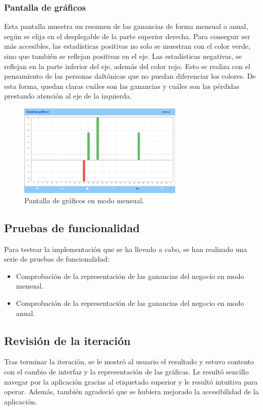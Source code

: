 \newpage

\subsubsection{Pantalla de gráficos}

Esta pantalla muestra un resumen de las ganancias de forma mensual o anual, según se elija en el desplegable de la parte superior derecha. Para conseguir ser más accesibles, las estadísticas positivas no solo se muestran con el color verde, sino que también se reflejan positivas en el eje. Las estadísticas negativas, se reflejan en la parte inferior del eje, además del color rojo. Esto se realiza con el pensamiento de las personas daltónicas que no puedan diferenciar los colores. De esta forma, quedan claras cuáles son las ganancias y cuáles son las pérdidas prestando atención al eje de la izquierda. 

\begin{figure}[H]
	\centering
	\includegraphics[width=0.7\textwidth]{imagenes/TerceraIteracion/graficosMensual.png}
	\caption{Pantalla de gráficos en modo mensual.}
\end{figure}

\subsection{Pruebas de funcionalidad}

Para testear la implementación que se ha llevado a cabo, se han realizado una serie de pruebas de funcionalidad: 

\begin{itemize}
	\item Comprobación de la representación de las ganancias del negocio en modo mensual. 
	\item Comprobación de la representación de las ganancias del negocio en modo anual. 
\end{itemize}

\subsection{Revisión de la iteración}

Tras terminar la iteración, se le mostró al usuario el resultado y estuvo contento con el cambio de interfaz y la representación de las gráficas. Le resultó sencillo navegar por la aplicación gracias al etiquetado superior y le resultó intuitiva para operar. Además, también agradeció que se hubiera mejorado la accesibilidad de la aplicación. 

